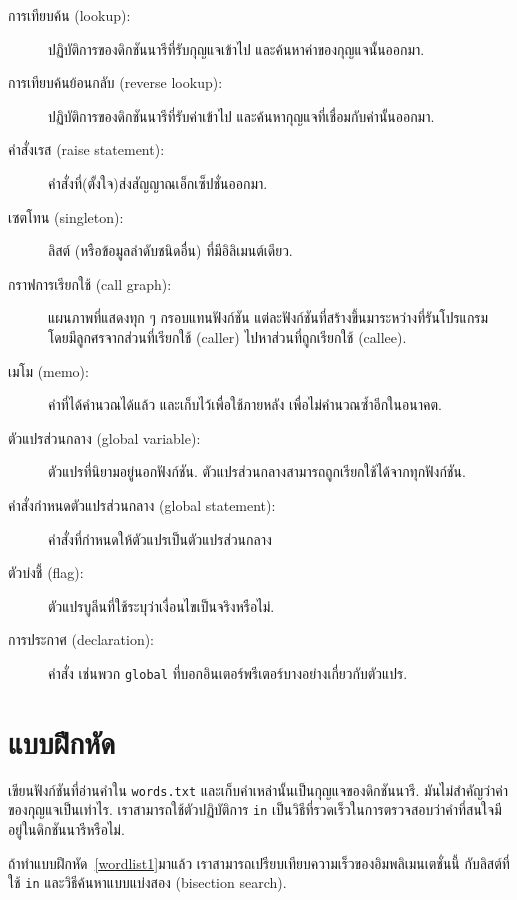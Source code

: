 \begin{description}
\item[การเทียบค้น (lookup):] ปฏิบัติการของดิกชันนารีที่รับกุญแจเข้าไป และค้นหาค่าของกุญแจนั้นออกมา.

\item[การเทียบค้นย้อนกลับ (reverse lookup):] ปฏิบัติการของดิกชันนารีที่รับค่าเข้าไป 
และค้นหากุญแจที่เชื่อมกับค่านั้นออกมา.

\item[คำสั่งเรส (raise statement):]  
คำสั่งที่(ตั้งใจ)ส่งสัญญาณเอ็กเซ็ปชั่นออกมา.

\item[เซตโทน (singleton):] ลิสต์ (หรือข้อมูลลำดับชนิดอื่น) ที่มีอิลิเมนต์เดียว.

\item[กราฟการเรียกใช้ (call graph):] แผนภาพที่แสดงทุก ๆ กรอบแทนฟังก์ชัน แต่ละฟังก์ชันที่สร้างขึ้นมาระหว่างที่รันโปรแกรม โดยมีลูกศรจากส่วนที่เรียกใช้ (caller) ไปหาส่วนที่ถูกเรียกใช้ (callee). 

\item[เมโม (memo):] ค่าที่ได้คำนวณได้แล้ว และเก็บไว้เพื่อใช้ภายหลัง เพื่อไม่คำนวณซ้ำอีกในอนาคต.

\item[ตัวแปรส่วนกลาง (global variable):] ตัวแปรที่นิยามอยู่นอกฟังก์ชัน.  
ตัวแปรส่วนกลางสามารถถูกเรียกใช้ได้จากทุกฟังก์ชัน.

\item[คำสั่งกำหนดตัวแปรส่วนกลาง (global statement):]  คำสั่งที่กำหนดให้ตัวแปรเป็นตัวแปรส่วนกลาง

\item[ตัวบ่งชี้ (flag):] ตัวแปรบูลีนที่ใช้ระบุว่าเงื่อนไขเป็นจริงหรือไม่.

\item[การประกาศ (declaration):] คำสั่ง เช่นพวก \texttt{global} ที่บอกอินเตอร์พรีเตอร์บางอย่างเกี่ยวกับตัวแปร.

\end{description}


\section{แบบฝึกหัด}

\begin{exercise}
\label{wordlist2}

เขียนฟังก์ชันที่อ่านคำใน \texttt{words.txt} และเก็บคำเหล่านั้นเป็นกุญแจของดิกชันนารี.  
มันไม่สำคัญว่าค่าของกุญแจเป็นเท่าไร.
เราสามารถใช้ตัวปฏิบัติการ \texttt{in} เป็นวิธีที่รวดเร็วในการตรวจสอบว่าคำที่สนใจมีอยู่ในดิกชันนารีหรือไม่.

ถ้าทำแบบฝึกหัด~\ref{wordlist1}มาแล้ว เราสามารถเปรียบเทียบความเร็วของอิมพลิเมนเตชั่นนี้ กับลิสต์ที่ใช้ \texttt{in} และวิธีค้นหาแบบแบ่งสอง (bisection search).

\end{exercise}
\vspace{0.5cm}


